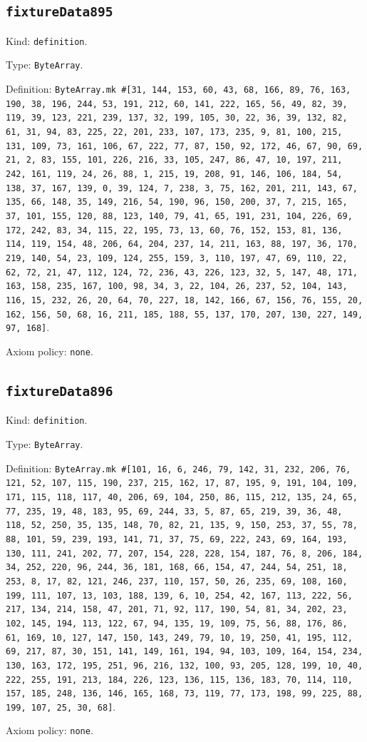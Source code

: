 \documentclass[11pt]{article}
\begin{document}
\subsection*{\texttt{fixtureData895}}
\noindent Kind: \texttt{definition}.\par
\noindent Type: \texttt{ByteArray}.\par
\noindent Definition: \texttt{ByteArray.mk \#[31, 144, 153, 60, 43, 68, 166, 89, 76, 163, 190, 38, 196, 244, 53, 191, 212, 60, 141, 222, 165, 56, 49, 82, 39, 119, 39, 123, 221, 239, 137, 32, 199, 105, 30, 22, 36, 39, 132, 82, 61, 31, 94, 83, 225, 22, 201, 233, 107, 173, 235, 9, 81, 100, 215, 131, 109, 73, 161, 106, 67, 222, 77, 87, 150, 92, 172, 46, 67, 90, 69, 21, 2, 83, 155, 101, 226, 216, 33, 105, 247, 86, 47, 10, 197, 211, 242, 161, 119, 24, 26, 88, 1, 215, 19, 208, 91, 146, 106, 184, 54, 138, 37, 167, 139, 0, 39, 124, 7, 238, 3, 75, 162, 201, 211, 143, 67, 135, 66, 148, 35, 149, 216, 54, 190, 96, 150, 200, 37, 7, 215, 165, 37, 101, 155, 120, 88, 123, 140, 79, 41, 65, 191, 231, 104, 226, 69, 172, 242, 83, 34, 115, 22, 195, 73, 13, 60, 76, 152, 153, 81, 136, 114, 119, 154, 48, 206, 64, 204, 237, 14, 211, 163, 88, 197, 36, 170, 219, 140, 54, 23, 109, 124, 255, 159, 3, 110, 197, 47, 69, 110, 22, 62, 72, 21, 47, 112, 124, 72, 236, 43, 226, 123, 32, 5, 147, 48, 171, 163, 158, 235, 167, 100, 98, 34, 3, 22, 104, 26, 237, 52, 104, 143, 116, 15, 232, 26, 20, 64, 70, 227, 18, 142, 166, 67, 156, 76, 155, 20, 162, 156, 50, 68, 16, 211, 185, 188, 55, 137, 170, 207, 130, 227, 149, 97, 168]}.\par
\noindent Axiom policy: \texttt{none}.\par
\subsection*{\texttt{fixtureData896}}
\noindent Kind: \texttt{definition}.\par
\noindent Type: \texttt{ByteArray}.\par
\noindent Definition: \texttt{ByteArray.mk \#[101, 16, 6, 246, 79, 142, 31, 232, 206, 76, 121, 52, 107, 115, 190, 237, 215, 162, 17, 87, 195, 9, 191, 104, 109, 171, 115, 118, 117, 40, 206, 69, 104, 250, 86, 115, 212, 135, 24, 65, 77, 235, 19, 48, 183, 95, 69, 244, 33, 5, 87, 65, 219, 39, 36, 48, 118, 52, 250, 35, 135, 148, 70, 82, 21, 135, 9, 150, 253, 37, 55, 78, 88, 101, 59, 239, 193, 141, 71, 37, 75, 69, 222, 243, 69, 164, 193, 130, 111, 241, 202, 77, 207, 154, 228, 228, 154, 187, 76, 8, 206, 184, 34, 252, 220, 96, 244, 36, 181, 168, 66, 154, 47, 244, 54, 251, 18, 253, 8, 17, 82, 121, 246, 237, 110, 157, 50, 26, 235, 69, 108, 160, 199, 111, 107, 13, 103, 188, 139, 6, 10, 254, 42, 167, 113, 222, 56, 217, 134, 214, 158, 47, 201, 71, 92, 117, 190, 54, 81, 34, 202, 23, 102, 145, 194, 113, 122, 67, 94, 135, 19, 109, 75, 56, 88, 176, 86, 61, 169, 10, 127, 147, 150, 143, 249, 79, 10, 19, 250, 41, 195, 112, 69, 217, 87, 30, 151, 141, 149, 161, 194, 94, 103, 109, 164, 154, 234, 130, 163, 172, 195, 251, 96, 216, 132, 100, 93, 205, 128, 199, 10, 40, 222, 255, 191, 213, 184, 226, 123, 136, 115, 136, 183, 70, 114, 110, 157, 185, 248, 136, 146, 165, 168, 73, 119, 77, 173, 198, 99, 225, 88, 199, 107, 25, 30, 68]}.\par
\noindent Axiom policy: \texttt{none}.\par
\end{document}
